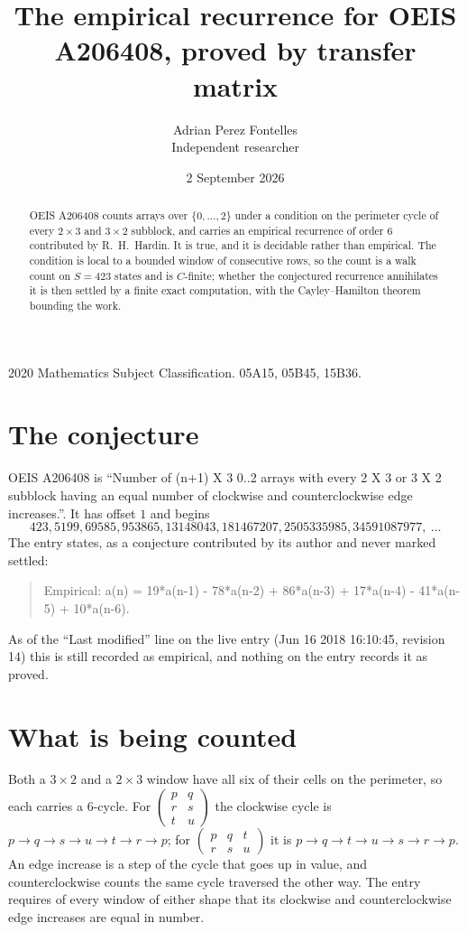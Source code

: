 \documentclass[11pt,a4paper]{article}
\title{The empirical recurrence for OEIS A206408, proved by transfer matrix}
\author{Adrian Perez Fontelles\\ \small Independent researcher}
\date{2 September 2026}
\theoremstyle{plain}
\theoremstyle{definition}
\begin{document}
\maketitle

\begin{abstract}
OEIS A206408 counts arrays over $\{0,\dots,2\}$ under a condition on the perimeter cycle of
every $2\times3$ and $3\times2$ subblock, and carries an empirical recurrence of order $6$ contributed by
R.~H.~Hardin. It is true, and it is decidable rather than empirical. The condition is local to
a bounded window of consecutive rows, so the count is a walk count on $S=423$ states and is
$C$-finite; whether the conjectured recurrence annihilates it is then settled by a finite exact
computation, with the Cayley--Hamilton theorem bounding the work.
\end{abstract}

\noindent\small 2020 Mathematics Subject Classification. 05A15, 05B45, 15B36.\normalsize

\section{The conjecture}

OEIS A206408 is ``Number of (n+1) X 3 0..2 arrays with every 2 X 3 or 3 X 2 subblock having an equal number of clockwise and counterclockwise edge increases.''. It has offset $1$ and begins
\[
423, 5199, 69585, 953865, 13148043, 181467207, 2505335985, 34591087977,\ \dots
\]
The entry states, as a conjecture contributed by its author and never marked settled:
\begin{quote}
Empirical: a(n) = 19*a(n-1) - 78*a(n-2) + 86*a(n-3) + 17*a(n-4) - 41*a(n-5) + 10*a(n-6).
\end{quote}
As of the ``Last modified'' line on the live entry (Jun 16 2018 16:10:45, revision 14) this is still
recorded as empirical, and nothing on the entry records it as proved.

\section{What is being counted}

Both a $3\times2$ and a $2\times3$ window have all six of their cells on the
perimeter, so each carries a $6$-cycle. For
$\begin{pmatrix}p&q\\r&s\\t&u\end{pmatrix}$ the clockwise cycle is
$p\to q\to s\to u\to t\to r\to p$; for
$\begin{pmatrix}p&q&t\\r&s&u\end{pmatrix}$ it is
$p\to q\to t\to u\to s\to r\to p$. An edge increase is a step of the cycle that goes up in
value, and counterclockwise counts the same cycle traversed the other way. The entry requires
of every window of either shape that its clockwise and counterclockwise edge increases are equal in number.
\end{document}
